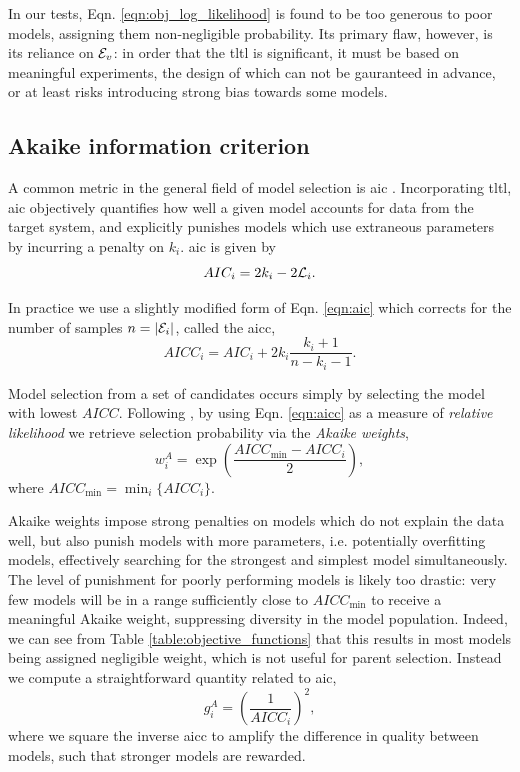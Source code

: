 In our tests, Eqn. \ref{eqn:obj_log_likelihood} is found to be too generous to poor models, 
    assigning them non-negligible probability. 
Its primary flaw, however, is its reliance on ${ \mathcal{E} }_v$: 
    in order that the \gls{tltl} is significant, it must be based on meaningful \glspl{experiment}, 
    the design of which can not be gauranteed in advance, or at least risks introducing strong bias
    towards some models. 

\subsection{Akaike information criterion}\label{sec:akaike_info_criterion}
A common metric in the general field of model selection is \gls{aic} \cite{dr2002model}.
Incorporating \gls{tltl}, 
    \gls{aic} objectively quantifies how well a given model accounts for data from the target system,
    and explicitly punishes models which use extraneous parameters by incurring a penalty on $k_i$. 
\gls{aic} is given by 
\begin{equation}
    \label{eqn:aic}
    AIC_i = 2k_i - 2 {\mathcal{L}}_{i}.
\end{equation}

In practice we use a slightly modified form of Eqn. \ref{eqn:aic} which
    corrects for the number of samples $n=\lvert{ \mathcal{E} }_i\rvert$, 
    called the \gls{aicc}, 
\begin{equation}
    \label{eqn:aicc}
    AICC_i = AIC_i + 2k_i \frac{k_i+1}{n-k_i-1}. 
\end{equation}

Model selection from a set of candidates occurs simply by selecting the model with lowest $AICC$.
Following \cite{dr2002model}, by using Eqn. \ref{eqn:aicc} as a measure of \emph{relative likelihood}
    we retrieve selection probability via
    the \emph{Akaike weights},
\begin{equation}
    \label{eqn:akaike_weights}
    w_i^A = \exp \left( \frac{{AICC_{\textrm{min}} - AICC_i}}{2} \right), 
\end{equation}
    where $AICC_{\textrm{min}} = \min_{i}\{ AICC_i\}$.

Akaike weights impose strong penalties 
    on models which do not explain the data well, 
    but also punish models with more parameters, i.e. potentially overfitting models, 
    effectively searching for the strongest and simplest model simultaneously.
The level of punishment for poorly performing models is likely too drastic: 
    very few models will be in a range sufficiently close to $AICC_{\textrm{min}}$ 
    to receive a meaningful Akaike weight, 
    suppressing diversity in the model population.
    Indeed, we can see from Table \ref{table:objective_functions} that this results in most 
    models being assigned negligible weight, which is not useful for parent selection. 
Instead we compute a straightforward quantity related to \gls{aic},
\begin{equation}
    \label{eqn:akaike_fitness}
    g_i^{A} = \left(\frac{1}{AICC_i}\right)^2,
\end{equation}
    where we square the inverse \gls{aicc} to amplify the difference in quality between models, 
    such that stronger models are rewarded.

